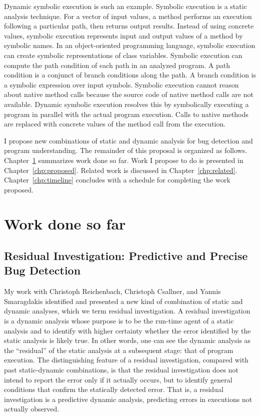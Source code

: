 \documentclass[proposal]{umthesis} %
\begin{document}
Dynamic symbolic execution\cite{Schwartz:2010:YEW:1849417.1849981} is such an example. Symbolic execution is a static analysis technique.  For a vector of input values, a method performs an execution following a particular path, then returns output results.  Instead of using concrete values, symbolic execution represents input and output values of a method by symbolic names. In an object-oriented programming language, symbolic execution can create symbolic representations of class variables. Symbolic execution can compute the path condition of each path in an analyzed program.  A path condition is a conjunct of branch conditions along the path.  A branch condition is a symbolic expression over input symbols. Symbolic execution cannot reason about native method calls because the source code of native method calls are not available.  Dynamic symbolic execution resolves this by symbolically executing a program in parallel with the actual program execution.  Calls to native methods are replaced with concrete values of the method call from the execution.  

I propose new combinations of static and dynamic analysis for bug detection and program understanding.  The remainder of this proposal is organized as follows.  Chapter~\ref{chp:worksofar} summarizes work done so far.  Work I propose to do is presented in Chapter~\ref{chp:proposed}.  Related work is discussed in Chapter~\ref{chp:related}.  Chapter~\ref{chp:timeline} concludes with a schedule for completing the work proposed.   


\chapter{Work done so far}
\label{chp:worksofar}

\section{Residual Investigation: Predictive and Precise Bug Detection}

My work\cite{rfbi-issta12} with Christoph Reichenbach, Christoph Csallner, and Yannis Smaragdakis identified and presented a new kind of combination of static and dynamic analyses, which we term residual investigation. A residual investigation is a dynamic analysis whose purpose is to be the run-time agent of a static analysis and to identify with higher certainty whether the error identified by the static analysis is likely true.  In other words, one can see the dynamic analysis as the “residual” of the static analysis at a subsequent stage: that of program execution. The distinguishing feature of a residual investigation, compared with past static-dynamic combinations, is that the residual investigation does not intend to report the error only if it actually occurs, but to identify general conditions that confirm the statically detected error. That is, a residual investigation is a predictive dynamic analysis, predicting errors in executions not actually observed.
\end{document}
